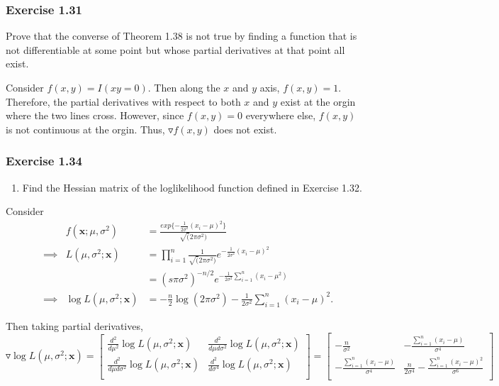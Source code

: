 \documentclass[12pt,]{article}
\providecommand{\tightlist}{%
  \setlength{\itemsep}{0pt}\setlength{\parskip}{0pt}}
\begin{document}
\hypertarget{exercise-1.31}{%
\subsubsection{Exercise 1.31}\label{exercise-1.31}}

Prove that the converse of Theorem 1.38 is not true by finding a
function that is not differentiable at some point but whose partial
derivatives at that point all exist.

Consider \(f(x,y) = I(xy = 0).\) Then along the \(x\) and \(y\) axis,
\(f(x,y) = 1.\) Therefore, the partial derivatives with respect to both
\(x\) and \(y\) exist at the orgin where the two lines cross. However,
since \(f(x,y) = 0\) everywhere else, \(f(x,y)\) is not continuous at
the orgin. Thus, \(\triangledown f(x,y)\) does not exist.

\hypertarget{exercise-1.34}{%
\subsubsection{Exercise 1.34}\label{exercise-1.34}}

\begin{enumerate}
\def\labelenumi{\alph{enumi}.}
\tightlist
\item
  Find the Hessian matrix of the loglikelihood function defined in
  Exercise 1.32.
\end{enumerate}

Consider \begin{align*}
&&f(\boldsymbol{x};\mu, \sigma^2) & = \frac{exp\{-\frac{1}{2\sigma^2}(x_i-\mu)^2\}}{\sqrt(2\pi\sigma^2)}\\
&\implies& L(\mu,\sigma^2;\boldsymbol{x}) &= \prod_{i = 1}^n \frac{1}{\sqrt(2\pi\sigma^2)}e^{-\frac{1}{2\sigma^2}(x_i-\mu)^2}\\
&&&=(s\pi\sigma^2)^{-n/2}e^{-\frac{1}{2\sigma^2}\sum_{i=1}^n(x_i-\mu^2)}\\
&\implies& \log L(\mu,\sigma^2;\boldsymbol{x}) &= -\frac{n}{2}\log(2\pi\sigma^2) - \frac{1}{2\sigma^2}\sum_{i = 1}^n (x_i-\mu)^2.
\end{align*}

Then taking partial derivatives,
\[\triangledown \log L(\mu,\sigma^2;\boldsymbol{x}) = 
\begin{bmatrix}
\frac{d^2}{d\mu^2}\log L(\mu,\sigma^2;\boldsymbol{x}) & \frac{d^2}{d\mu d\sigma^2}\log L(\mu,\sigma^2;\boldsymbol{x}) \\
\frac{d^2}{d\mu d\sigma^2}\log L(\mu,\sigma^2;\boldsymbol{x}) & \frac{d^2}{d\sigma^4}\log L(\mu,\sigma^2;\boldsymbol{x})\\
\end{bmatrix} =
\begin{bmatrix}
-\frac{n}{\sigma^2} & -\frac{\sum_{i=1}^n(x_i-\mu)}{\sigma^4}\\
-\frac{\sum_{i=1}^n(x_i-\mu)}{\sigma^4} & \frac{n}{2\sigma^4}-\frac{\sum_{i=1}^n(x_i-\mu)^2}{\sigma^6}\\
\end{bmatrix} \]
\end{document}
